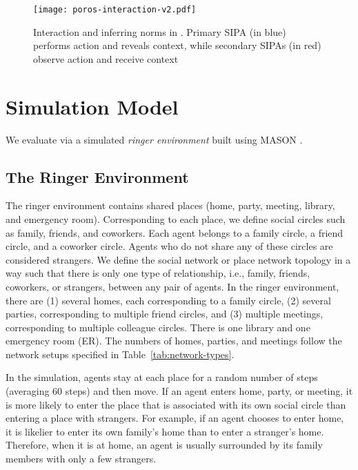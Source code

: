 \begin{figure}[!htb]
    \centering
    \texttt{[image: poros-interaction-v2.pdf]}
    \caption[Interaction and inferring norms in \frameworkB]{Interaction and inferring norms in \frameworkB. Primary SIPA (in blue) performs action and reveals context, while secondary SIPAs (in red) observe action and receive context}
    \label{fig:poros-interaction}
\end{figure}

\section{Simulation Model}
\label{sec:Poros-simulation-model}

We evaluate \frameworkB via a simulated 
\emph{ringer environment} built using MASON \citep{Luke-2005-Mason}.

\subsection{The Ringer Environment}
The ringer environment contains shared places (home, party, meeting, library, and emergency room).
Corresponding to each place, we define social circles such as family, friends, and coworkers. Each agent belongs to a family circle, a friend circle, and a coworker circle. Agents who do not share any of these circles are considered strangers. We define the social network or place network topology in a way such that there is only one type of relationship, i.e., family, friends, coworkers, or strangers, between any pair of agents. 
In the ringer environment, there are (1) several homes, each corresponding to a family circle, (2) several parties, corresponding to multiple friend circles, and (3) multiple meetings, corresponding to multiple colleague circles. There is one library and one emergency room (ER). The numbers of homes, parties, and meetings follow the network setups specified in Table~\ref{tab:network-types}.

In the simulation, agents stay at each place for a random number of steps (averaging 60 steps) and then move. If an agent enters home, party, or meeting, it is more likely to enter the place that is associated with its own social circle than entering a place with strangers. For example, if an agent chooses to enter home, it is likelier to enter its own family's home than to enter a stranger's home. Therefore, when it is at home, an agent is usually surrounded by its family members with only a few strangers. 

